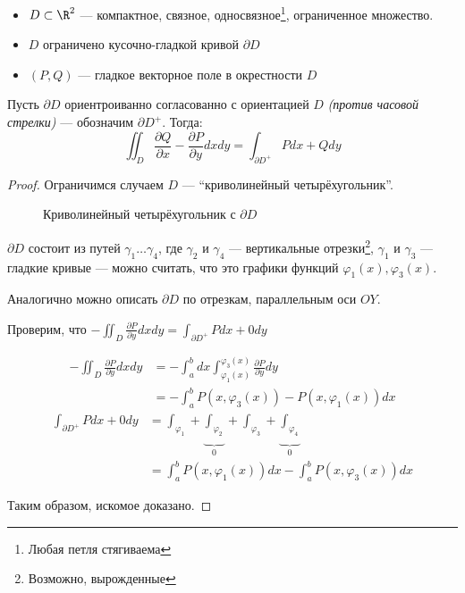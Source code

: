\begin{theorem}\itemfix
    \begin{itemize}
        \item \(D\subset \R^2\) --- компактное, связное, односвязное\footnote{Любая петля стягиваема}, ограниченное множество.
        \item \(D\) ограничено кусочно-гладкой кривой \(\partial D\)
        \item \((P, Q)\) --- гладкое векторное поле в окрестности \(D\)
    \end{itemize}

    Пусть \(\partial D\) ориентроиванно согласованно с ориентацией \(D\) \textit{(против часовой стрелки)} --- обозначим \(\partial D^{ +}\). Тогда:
    \[\iint_D \frac{\partial Q}{\partial x} - \frac{\partial P}{\partial y} dx dy = \int_{\partial D^{ +}} Pdx + Qdy\]
\end{theorem}
\begin{proof}
    Ограничимся случаем \(D\) --- ``криволинейный четырёхугольник''.

    \begin{figure}[h]
        
        \centering
        \caption{Криволинейный четырёхугольник с \(\partial D\)}
    \end{figure}

    \(\partial D\) состоит из путей \(\gamma_1 \dots \gamma_4\), где \(\gamma_2\) и \(\gamma_4\) --- вертикальные отрезки\footnote{Возможно, вырожденные}, \(\gamma_1\) и \(\gamma_3\) --- гладкие кривые --- можно считать, что это графики функций \(\varphi_1(x), \varphi_3(x)\).

    Аналогично можно описать \(\partial D\) по отрезкам, параллельным оси \(OY\). %

    Проверим, что \( - \iint_D \frac{\partial P}{\partial y} dx dy = \int_{\partial D^{ +}} Pdx + 0 dy\)

    \begin{align*}
        - \iint_D \frac{\partial P}{\partial y} dx dy & = -\int_a^b dx \int_{\varphi_1(x)}^{\varphi_3(x)} \frac{\partial P}{\partial y} dy \\
                                                      & = -\int_a^b P(x, \varphi_3(x)) - P(x, \varphi_1(x)) dx
    \end{align*}
    \begin{align*}
        \int_{\partial D^{ +}} Pdx + 0 dy & = \int_{\varphi_1} + \underbrace{\int_{\varphi_2}}_0 + \int_{\varphi_3} + \underbrace{\int_{\varphi_4}}_0 \\
                                          & = \int_a^b P(x, \varphi_1(x)) dx - \int_a^b P(x, \varphi_3(x)) dx
    \end{align*}

    Таким образом, искомое доказано.
\end{proof}

